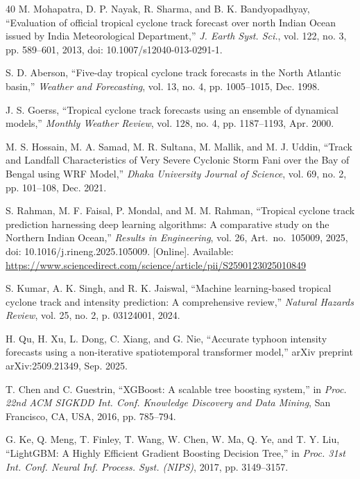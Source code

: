 \documentclass{ametsocv6.1}
\begin{document}
\begin{thebibliography}{40}
M. Mohapatra, D. P. Nayak, R. Sharma, and B. K. Bandyopadhyay, ``Evaluation of official tropical cyclone track forecast over north Indian Ocean issued by India Meteorological Department,'' \textit{J. Earth Syst. Sci.}, vol. 122, no. 3, pp. 589--601, 2013, doi: 10.1007/s12040-013-0291-1.

S. D. Aberson, ``Five-day tropical cyclone track forecasts in the North Atlantic basin,'' \textit{Weather and Forecasting}, vol. 13, no. 4, pp. 1005--1015, Dec. 1998.

J. S. Goerss, ``Tropical cyclone track forecasts using an ensemble of dynamical models,'' \textit{Monthly Weather Review}, vol. 128, no. 4, pp. 1187--1193, Apr. 2000.

M. S. Hossain, M. A. Samad, M. R. Sultana, M. Mallik, and M. J. Uddin, ``Track and Landfall Characteristics of Very Severe Cyclonic Storm Fani over the Bay of Bengal using WRF Model,'' \textit{Dhaka University Journal of Science}, vol. 69, no. 2, pp. 101--108, Dec. 2021.

S. Rahman, M. F. Faisal, P. Mondal, and M. M. Rahman, ``Tropical cyclone track prediction harnessing deep learning algorithms: A comparative study on the Northern Indian Ocean,'' \textit{Results in Engineering}, vol. 26, Art.\ no.\ 105009, 2025, doi: 10.1016/j.rineng.2025.105009. [Online]. Available: \url{https://www.sciencedirect.com/science/article/pii/S2590123025010849}

S. Kumar, A. K. Singh, and R. K. Jaiswal, ``Machine learning-based tropical cyclone track and intensity prediction: A comprehensive review,'' \textit{Natural Hazards Review}, vol. 25, no. 2, p. 03124001, 2024.

H. Qu, H. Xu, L. Dong, C. Xiang, and G. Nie, ``Accurate typhoon intensity forecasts using a non-iterative spatiotemporal transformer model,'' arXiv preprint arXiv:2509.21349, Sep. 2025.

T. Chen and C. Guestrin, ``XGBoost: A scalable tree boosting system,'' in \textit{Proc. 22nd ACM SIGKDD Int. Conf. Knowledge Discovery and Data Mining}, San Francisco, CA, USA, 2016, pp. 785--794.

G. Ke, Q. Meng, T. Finley, T. Wang, W. Chen, W. Ma, Q. Ye, and T. Y. Liu, ``LightGBM: A Highly Efficient Gradient Boosting Decision Tree,'' in \textit{Proc. 31st Int. Conf. Neural Inf. Process. Syst. (NIPS)}, 2017, pp. 3149--3157.


\end{thebibliography}
\end{document}

